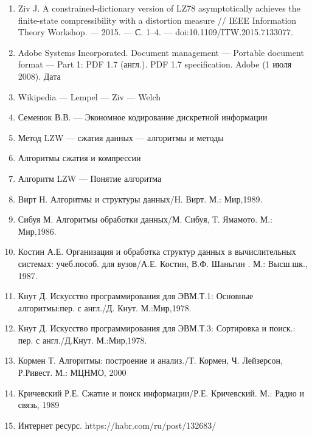 \documentclass{article}
\begin{document}
\begin{enumerate}
\item Ziv J. A constrained-dictionary version of LZ78 asymptotically achieves the finite-state compressibility with a distortion measure // IEEE Information Theory Workshop. — 2015. — С. 1–4. — doi:10.1109/ITW.2015.7133077.
\item Adobe Systems Incorporated. Document management — Portable document format — Part 1: PDF 1.7 (англ.). PDF 1.7 specification. Adobe (1 июля 2008). Дата
\item Wikipedia — Lempel — Ziv — Welch
\item Семенюк В.В. — Экономное кодирование дискретной информации
\item Метод LZW — сжатия данных — алгоритмы и методы
\item Алгоритмы сжатия и компрессии
\item Алгоритм LZW — Понятие алгоритма
\item Вирт Н. Алгоритмы и структуры данных/Н. Вирт. М.: Мир,1989.
\item Сибуя М. Алгоритмы обработки данных/М. Сибуя, Т. Ямамото. М.: Мир,1986.
\item Костин А.Е. Организация и обработка структур данных в вычислительных системах: учеб.пособ. для вузов/А.Е. Костин, В.Ф. Шаньгин . М.: Высш.шк., 1987.
\item Кнут Д. Искусство программирования для ЭВМ.Т.1: Основные алгоритмы:пер. с англ./Д. Кнут. М.:Мир,1978.
\item Кнут Д. Искусство программирования для ЭВМ.Т.3: Сортировка и поиск.: пер. с англ./Д.Кнут. М.:Мир,1978.
\item Кормен Т. Алгоритмы: построение и анализ./Т. Кормен, Ч. Лейзерсон, Р.Ривест. М.: МЦНМО, 2000
\item Кричевский Р.Е. Сжатие и поиск информации/Р.Е. Кричевский. М.: Радио и связь, 1989
\item Интернет ресурс. https://habr.com/ru/post/132683/
\end{enumerate}
\end{document}
